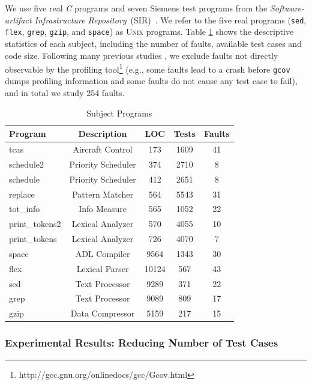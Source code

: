 We use five real {\em C} programs and seven Siemens test programs from the
{\em Software-artifact Infrastructure Repository}~(SIR)~\citep{doESE05}. We refer to the five real programs (\texttt{sed}, \texttt{flex}, \texttt{grep}, \texttt{gzip}, and \texttt{space}) as \textsc{Unix} programs. Table \ref{dataset} shows the descriptive statistics of each subject,
including the number of faults, available test cases and code size. Following many previous studies \citep[e.g.][]{JHS02,Abreu:2009.jss}, we exclude faults not directly observable by the profiling
tool\footnote{http://gcc.gnu.org/onlinedocs/gcc/Gcov.html} (e.g., some faults lead to a crash before \texttt{gcov} dumps profiling information and some faults do not cause any test case to fail), and in total we study 254 faults.

\begin{table}[!htbp]
	\centering
	\caption{Subject Programs}
	\renewcommand{\arraystretch}{1.5}
	\small
    \begin{tabular}{|l|c|c|c|c|} \hline
        Program & Description & LOC  & Tests & Faults\\ \hline\hline
		tcas & Aircraft Control & 173 & 1609 & 41\\ \hline
        schedule2 & Priority Scheduler & 374  & 2710  & 8\\ \hline
        schedule & Priority Scheduler & 412 & 2651  & 8\\ \hline
        replace & Pattern Matcher & 564 & 5543  & 31\\ \hline
		tot\_info & Info Measure & 565 & 1052  & 22\\ \hline
        print\_tokens2 & Lexical Analyzer & 570  & 4055  & 10\\ \hline
        print\_tokens & Lexical Analyzer & 726 & 4070  & 7\\ \hline
        space & ADL Compiler & 9564 & 1343 & 30\\ \hline
        flex & Lexical Parser & 10124 & 567  & 43\\ \hline
        sed & Text Processor & 9289  & 371  & 22\\ \hline
        grep & Text Processor & 9089 & 809  & 17\\ \hline
        gzip & Data Compressor & 5159 & 217  & 15\\ \hline
	\end{tabular}
	\label{dataset}
\end{table}

\subsubsection{Experimental Results: Reducing Number of Test Cases}\label{sec.exp.resultsA}

